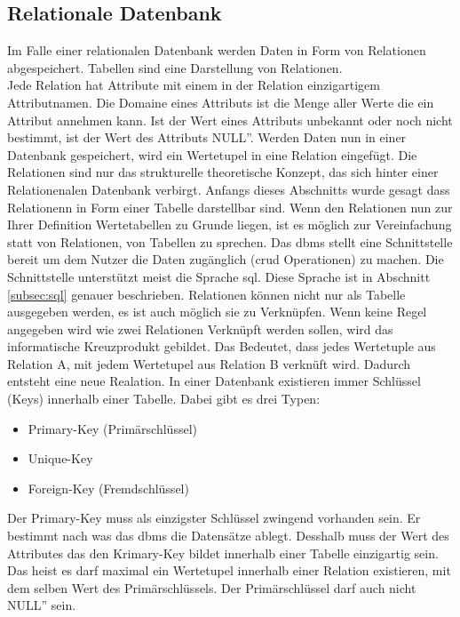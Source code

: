 \subsection{Relationale Datenbank}\label{subsec:relDB}
Im Falle einer relationalen Datenbank werden Daten in Form von Relationen abgespeichert.
Tabellen sind eine Darstellung von Relationen.\\
Jede Relation hat Attribute mit einem in der Relation einzigartigem Attributnamen.
Die Domaine eines Attributs ist die Menge aller Werte die ein Attribut annehmen kann.
Ist der Wert eines Attributs unbekannt oder noch nicht bestimmt, ist der Wert des Attributs \glqq{}NULL''.\citep{Studer:2016:2}
Werden Daten nun in einer Datenbank gespeichert, wird ein Wertetupel in eine Relation eingefügt.
Die Relationen sind nur das strukturelle theoretische Konzept, das sich hinter einer Relationenalen Datenbank verbirgt.
Anfangs dieses Abschnitts wurde gesagt dass Relationenn in Form einer Tabelle darstellbar sind.
Wenn den Relationen nun zur Ihrer Definition Wertetabellen zu Grunde liegen, 
ist es möglich zur Vereinfachung statt von Relationen, von Tabellen zu sprechen.
Das \ac{dbms} stellt eine Schnittstelle bereit um dem Nutzer die Daten zugänglich (\ac{crud} Operationen) zu machen.
Die Schnittstelle unterstützt meist die Sprache \ac{sql}. Diese Sprache ist in Abschnitt \ref{subsec:sql} genauer beschrieben.
Relationen können nicht nur als Tabelle ausgegeben werden, es ist auch möglich sie zu Verknüpfen.
Wenn keine Regel angegeben wird wie zwei Relationen Verknüpft werden sollen, wird das informatische Kreuzprodukt gebildet.
Das Bedeutet, dass jedes Wertetuple aus Relation A, mit jedem Wertetupel aus Relation B verknüft wird. 
Dadurch entsteht eine neue Realation.
In einer Datenbank existieren immer Schlüssel (Keys) innerhalb einer Tabelle.
Dabei gibt es drei Typen:
\begin{itemize}
  \item Primary-Key (Primärschlüssel)
  \item Unique-Key
  \item Foreign-Key (Fremdschlüssel)
\end{itemize}
Der Primary-Key muss als einzigster Schlüssel zwingend vorhanden sein. Er bestimmt nach was das \ac{dbms} die Datensätze ablegt.
Desshalb muss der Wert des Attributes das den Krimary-Key bildet innerhalb einer Tabelle einzigartig sein.
Das heist es darf maximal ein Wertetupel innerhalb einer Relation existieren, mit dem selben Wert des Primärschlüssels.
Der Primärschlüssel darf auch nicht \glqq{}NULL'' sein.
